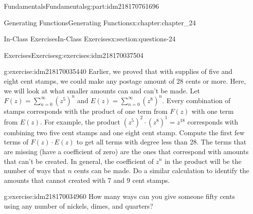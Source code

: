 \documentclass[oneside,10pt,]{book}
\numberwithin{equation}{section}
\begin{document}
\begin{partptx}{Fundamentals}{}{Fundamentals}{}{}{g:part:idm218170761696}
\begin{chapterptx}{Generating Functions}{}{Generating Functions}{}{}{x:chapter:chapter_24}
\begin{sectionptx}{In-Class Exercises}{}{In-Class Exercises}{}{}{x:section:questions-24}
\begin{exercises-subsection-numberless}{Exercises}{}{Exercises}{}{}{g:exercises:idm218170037504}
\begin{exercisegroup}
\begin{divisionexerciseeg}{2}{}{}{g:exercise:idm218170035440}
Earlier, we proved that with supplies of five and eight cent stamps, we could make any postage amount of 28 cents or more.  Here, we will look at what smaller amounts can and can't be made.  Let \(F(z)= \sum_{n=0}^{\infty} (z^{5})^n\) and \(E(z)=\sum_{n=0}^{\infty} (z^{8})^n\).  Every combination of stamps corresponds with the product of one term from \(F(z)\) with one term from \(E(z)\).  For example, the product \((z^{5})^{2}\cdot (z^{8})^1= z^{18}\)  corresponds with combining two five cent stamps and one eight cent stamp.  Compute the first few terms of \(F(z)\cdot E(z)\) to  get all terms with degree less than 28. The terms that are missing (have a coefficient of zero) are the ones that correspond with amounts that can't be created.  In general, the coefficient of \(z^n\) in the product will be the number of ways that \(n\) cents can be made. Do a similar calculation to identify the amounts that cannot created with 7 and 9 cent stamps.%
\end{divisionexerciseeg}%
\begin{divisionexerciseeg}{3}{}{}{g:exercise:idm218170034960}%
How many ways can you give someone fifty cents using any number of nickels, dimes, and quarters?%
\end{divisionexerciseeg}%
\end{exercisegroup}
\par\medskip\noindent
\end{exercises-subsection-numberless}
\end{sectionptx}
\end{chapterptx}
\end{partptx}
%
%
\typeout{************************************************}
\typeout{************************************************}
%
\end{document}
